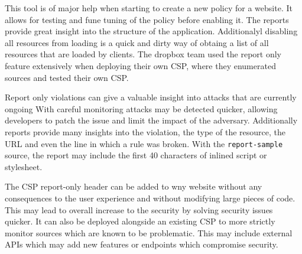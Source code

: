 \documentclass[11]{article}   %
\begin{document}
This tool is of major help when starting to create a new policy for a website.
It allows for testing and fune tuning of the policy before enabling it. 
The reports provide great insight into the structure of the application.
Additionalyl disabling all resources from loading is a quick and dirty way of obtaing a list of all resources that are loaded by clients.
The dropbox team used the report only feature extensively when deploying their own CSP, where they enumerated sources and tested their own CSP. 


Report only violations can give a valuable insight into attacks that are currently ongoing 
With careful monitoring attacks may be detected quicker, allowing developers to patch the issue and limit the impact of the adversary.
Additionally reports provide many insights into the violation, the type of the resource, the URL and even the line in which a rule was broken.
With the \texttt{report-sample} source, the report may include the first 40 characters of inlined script or stylesheet.

The CSP report-only header can be added to wny website without any consequences to the user experience and without modifying large pieces of code.
This may lead to overall increase to the security by solving security issues quicker.
It can also be deployed alongside an existing CSP to more strictly monitor sources which are known to be problematic.
This may include external APIs which may add new features or endpoints which compromise security.
\end{document}
